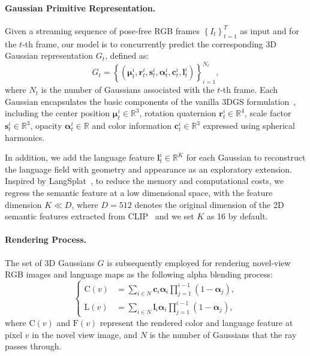 \paragraph{Gaussian Primitive Representation.} Given a streaming sequence of pose-free RGB frames $\left\{I_t\right\}_{t=1}^{T}$ as input and for the $t$-th frame, our model is to concurrently predict the corresponding 3D Gaussian representation $G_t$, defined as:
\begin{equation}
    G_t = \left\{ \left( \mathbf{\mu}_t^i, \mathbf{r}_t^i, \mathbf{s}_t^i, \mathbf{\alpha}_t^i, \mathbf{c}_t^i, \mathbf{l}_t^i \right) \right\}_{i=1}^{N_t},
\end{equation}where $N_t$ is the number of Gaussians associated with the $t$-th frame. Each Gaussian encapsulates the basic components of the vanilla 3DGS formulation~\cite{kerbl20233d}, including the center position $\mathbf{\mu}_t^i \in \mathbb{R}^3$, rotation quaternion $\mathbf{r}_t^i \in \mathbb{R}^4$, scale factor $\mathbf{s}_t^i \in \mathbb{R}^3$, opacity $\mathbf{\alpha}_t^i \in \mathbb{R}$ and color information $\mathbf{c}_t^i \in \mathbb{R}^3$ expressed using spherical harmonics. 

In addition, we add the language feature $\mathbf{l}_t^i \in \mathbb{R}^K$ for each Gaussian to reconstruct the language field with geometry and appearance as an exploratory extension. Inspired by LangSplat~\cite{qin2024langsplat}, to reduce the memory and computational costs, we regress the semantic feature at a low dimensional space, with the feature dimension $K \ll D$, where $D = 512$ denotes the original dimension of the 2D semantic features extracted from CLIP~\cite{radford2021learning} and we set $K$ as 16 by default.

\paragraph{Rendering Process.} The set of 3D Gaussians $G$ is subsequently employed for rendering novel-view RGB images and language maps as the following alpha blending process:
\begin{equation}
    \left\{
    \begin{aligned}
    \mathrm{C}(v) &= \sum_{i\in N} \mathbf{c}_i \mathbf{\alpha}_i \prod_{j=1}^{i-1} (1-\mathbf{\alpha}_j), \\
    \mathrm{L}(v) &= \sum_{i\in N} \mathbf{l}_i \mathbf{\alpha}_i \prod_{j=1}^{i-1} (1-\mathbf{\alpha}_j),
    \end{aligned}
    \right.
\end{equation}where $\mathrm{C}(v)$ and $\mathrm{F}(v)$ represent the rendered color and language feature at pixel $v$ in the novel view image, and $N$ is the number of Gaussians that the ray passes through.

